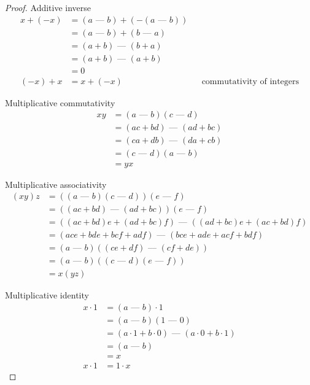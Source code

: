\documentclass[answers,12pt]{exam}
\newcommand{\fakeminus}{\text{ --- }}
\begin{document}
\begin{solution}
\begin{proof}
    Additive inverse
    \begin{align*}
        x + (-x) &= (a \fakeminus b) + (- (a \fakeminus b)) \\
        &= (a \fakeminus b) + (b \fakeminus a) \\
        &= (a+b) \fakeminus (b+a) \\
        &= (a+b) \fakeminus (a+b) \\ 
        &= 0 \\
        (-x)+x &= x + (-x) && \text{commutativity of integers}
    \end{align*}

    Multiplicative commutativity
    \begin{align*}
        xy &= (a \fakeminus b)(c \fakeminus d) \\
        &= (ac + bd) \fakeminus (ad + bc) \\
        &= (ca + db) \fakeminus (da + cb) \\ 
        &= (c \fakeminus d)(a \fakeminus b) \\
        &= yx
    \end{align*}

    Multiplicative associativity
    \begin{align*}
        (xy)z &= ((a \fakeminus b)(c \fakeminus d))(e \fakeminus f) \\
        &= ((ac + bd) \fakeminus (ad + bc))(e \fakeminus f) \\
        &= ((ac + bd)e + (ad + bc)f) \fakeminus ((ad + bc)e + (ac + bd)f) \\ 
        &= (ace + bde + bcf + adf) \fakeminus (bce + ade + acf + bdf) \\
        &= (a \fakeminus b)((ce + df) \fakeminus (cf + de)) \\
        &= (a \fakeminus b)((c \fakeminus d)(e \fakeminus f)) \\
        &= x(yz)
    \end{align*}

    Multiplicative identity
    \begin{align*}
        x \cdot 1 &= (a \fakeminus b) \cdot 1 \\
        &= (a \fakeminus b)(1 \fakeminus 0) \\
        &= (a \cdot 1 + b \cdot 0) \fakeminus (a \cdot 0 + b \cdot 1) \\
        &= (a \fakeminus b) \\
        &= x \\
        x \cdot 1 &= 1 \cdot x
    \end{align*}
    

\end{proof}
\end{solution}
\end{document}
